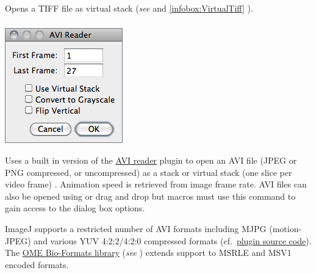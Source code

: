\subsubsection{\protect{}\label{sub:Import>TIFF-Virtual-Stack}}

Opens a TIFF file as virtual stack (\emph{see}
 and \ref{infobox:VirtualTiff} ).


\subsubsection[\protect\userinterface{AVI\ldots{}}]{\protect{}\label{sub:Import>AVI...}}

\begin{minipage}[c][1\totalheight][t]{0.29\columnwidth}%
\includegraphics[scale=0.55]{images/AviReader}%
\end{minipage}%
\begin{minipage}[c][1\totalheight][t]{0.71\columnwidth}%
Uses a built in version of the \href{http://imagej.nih.gov/ij/plugins/avi-reader.html}{AVI reader}
plugin to open an AVI file (JPEG or PNG compressed, or
uncompressed) as a stack or virtual stack (one slice per video frame)
\cite{C-AviPlugins}. Animation speed is retrieved from image frame
rate. AVI files can also be opened using or
drag and drop but macros must use this command to gain access to the
dialog box options.\medskip{}


ImageJ supports a restricted number of AVI formats including MJPG
(motion-JPEG) and various YUV 4:2:2/4:2:0 compressed formats (cf.\ \href{http://imagej.nih.gov/ij/source/ij/plugin/AVI_Reader.java}{plugin source code}).
The \href{http://loci.wisc.edu/software/bio-formats}{OME Bio-Formats library}
(\emph{see} ) extends support
to  MSRLE and MSV1 encoded formats.%
\end{minipage}

